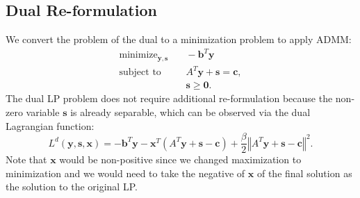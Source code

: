 \documentclass{article}
\begin{document}
\vspace{0.1in}
\subsection*{Dual Re-formulation}
We convert the problem of the dual to a minimization problem to apply ADMM:
\begin{align}
\text{minimize}_{\mathbf{y}, \mathbf{s}} &\quad -\mathbf{b}^T\mathbf{y}  \tag{OPT4}\label{OPT4} \\
\text{subject to } &\quad  A^T \mathbf{y}  + \mathbf{s} = \mathbf{c},  \nonumber \\
&\quad \mathbf{s} \geq \mathbf{0} \nonumber.
\end{align}
The dual LP problem does not require additional re-formulation because the non-zero variable $\mathbf{s}$ is already separable, which can be observed via the dual Lagrangian function:
\[
L^{d}(\mathbf{y},\mathbf{s},\mathbf{x})=-\mathbf{b}^{T}\mathbf{y}-\mathbf{x}^{T}\left(A^{T}\mathbf{y}+\mathbf{s}-\mathbf{c}\right)+\frac{\beta}{2}\left\Vert A^{T}\mathbf{y}+\mathbf{s}-\mathbf{c}\right\Vert ^{2}.
\]
Note that $\mathbf{x}$ would be non-positive since we changed maximization to minimization and we would need to take the negative of $\mathbf{x}$ of the final solution as the solution to the original LP.

\vspace{0.1in}
\end{document}
